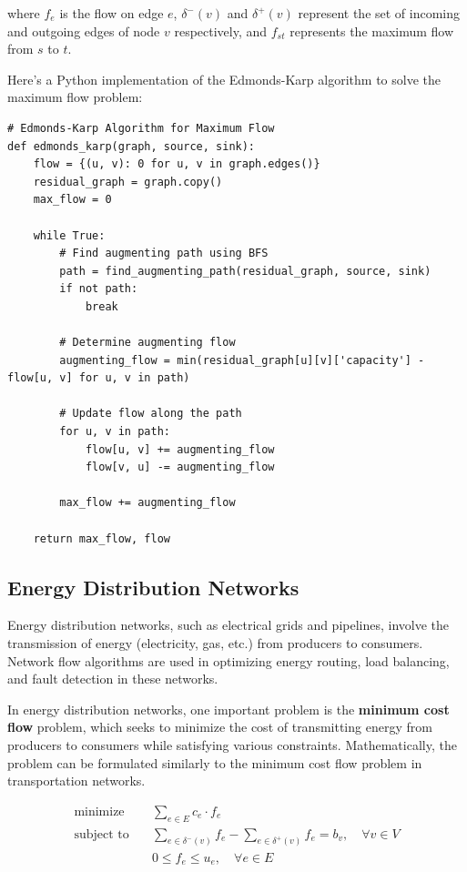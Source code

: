 \documentclass[12pt]{book} %
\begin{document}
where \(f_e\) is the flow on edge \(e\), \(\delta^-(v)\) and \(\delta^+(v)\) represent the set of incoming and outgoing edges of node \(v\) respectively, and \(f_{st}\) represents the maximum flow from \(s\) to \(t\).

Here's a Python implementation of the Edmonds-Karp algorithm to solve the maximum flow problem:
\FloatBarrier
\begin{lstlisting}
# Edmonds-Karp Algorithm for Maximum Flow
def edmonds_karp(graph, source, sink):
    flow = {(u, v): 0 for u, v in graph.edges()}
    residual_graph = graph.copy()
    max_flow = 0
    
    while True:
        # Find augmenting path using BFS
        path = find_augmenting_path(residual_graph, source, sink)
        if not path:
            break
        
        # Determine augmenting flow
        augmenting_flow = min(residual_graph[u][v]['capacity'] - flow[u, v] for u, v in path)
        
        # Update flow along the path
        for u, v in path:
            flow[u, v] += augmenting_flow
            flow[v, u] -= augmenting_flow
        
        max_flow += augmenting_flow
    
    return max_flow, flow
\end{lstlisting}
\FloatBarrier

\subsection{Energy Distribution Networks}
Energy distribution networks, such as electrical grids and pipelines, involve the transmission of energy (electricity, gas, etc.) from producers to consumers. Network flow algorithms are used in optimizing energy routing, load balancing, and fault detection in these networks.

In energy distribution networks, one important problem is the \textbf{minimum cost flow} problem, which seeks to minimize the cost of transmitting energy from producers to consumers while satisfying various constraints. Mathematically, the problem can be formulated similarly to the minimum cost flow problem in transportation networks.

\[
\begin{aligned}
\text{minimize} \quad & \sum_{e \in E} c_e \cdot f_e \\
\text{subject to} \quad & \sum_{e \in \delta^-(v)} f_e - \sum_{e \in \delta^+(v)} f_e = b_v, \quad \forall v \in V \\
& 0 \leq f_e \leq u_e, \quad \forall e \in E
\end{aligned}
\]
\end{document}
